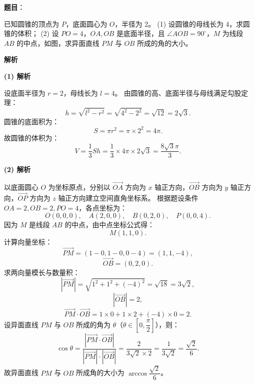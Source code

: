 \begin{answer}

\textbf{题目}：

已知圆锥的顶点为 $P$，底面圆心为 $O$，半径为 2。
(1) 设圆锥的母线长为 4，求圆锥的体积；
(2) 设 $PO = 4$，$OA, OB$ 是底面半径，且 $\angle AOB = 90^\circ$，$M$ 为线段 $AB$ 的中点，如图，求异面直线 $PM$ 与 $OB$ 所成的角的大小。
\nopagebreak[4]
\begin{center}\end{center}
\nopagebreak[4]
\textbf{解析}

\textbf{(1) 解析}

设底面半径为 $r = 2$，母线长为 $l = 4$。
由圆锥的高、底面半径与母线满足勾股定理：
\nopagebreak[4]
\[h = \sqrt{l^2 - r^2} = \sqrt{4^2 - 2^2} = \sqrt{12} = 2\sqrt{3}.\]
圆锥的底面积为：
\nopagebreak[4]
\[S = \pi r^2 = \pi \times 2^2 = 4\pi.\]
故圆锥的体积为：
\nopagebreak[4]
\[V = \frac{1}{3} S h = \frac{1}{3} \times 4\pi \times 2\sqrt{3} = \frac{8\sqrt{3}\pi}{3}.\]

\textbf{(2) 解析}

以底面圆心 $O$ 为坐标原点，分别以 $\vec{OA}$ 方向为 $x$ 轴正方向，$\vec{OB}$ 方向为 $y$ 轴正方向，$\vec{OP}$ 方向为 $z$ 轴正方向建立空间直角坐标系。
根据题设条件 $OA = 2, OB = 2, PO = 4$，各点坐标为：
\nopagebreak[4]
\[O(0, 0, 0), \quad A(2, 0, 0), \quad B(0, 2, 0), \quad P(0, 0, 4).\]
因为 $M$ 是线段 $AB$ 的中点，由中点坐标公式得：
\nopagebreak[4]
\[M(1, 1, 0).\]
计算向量坐标：
\nopagebreak[4]
\[\vec{PM} = (1 - 0, 1 - 0, 0 - 4) = (1, 1, -4),\]
\nopagebreak[4]
\[\vec{OB} = (0, 2, 0).\]
求两向量模长与数量积：
\nopagebreak[4]
\[|\vec{PM}| = \sqrt{1^2 + 1^2 + (-4)^2} = \sqrt{18} = 3\sqrt{2},\]
\nopagebreak[4]
\[|\vec{OB}| = 2,\]
\nopagebreak[4]
\[\vec{PM} \cdot \vec{OB} = 1 \times 0 + 1 \times 2 + (-4) \times 0 = 2.\]
设异面直线 $PM$ 与 $OB$ 所成的角为 $\theta$（$\theta \in \left[0, \dfrac{\pi}{2}\right]$），则：
\nopagebreak[4]
\[\cos\theta = \frac{|\vec{PM} \cdot \vec{OB}|}{|\vec{PM}| \cdot |\vec{OB}|} = \frac{2}{3\sqrt{2} \times 2} = \frac{1}{3\sqrt{2}} = \frac{\sqrt{2}}{6}.\]
故异面直线 $PM$ 与 $OB$ 所成角的大小为 $\arccos\dfrac{\sqrt{2}}{6}$。



\end{answer}
